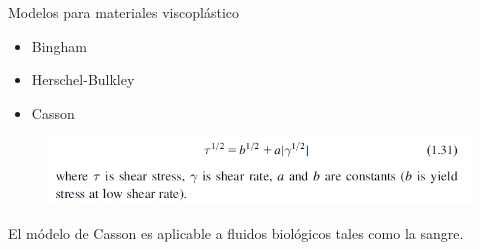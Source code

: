 \begin{frame}{Modelos para materiales viscoplástico}
\justifying
\begin{itemize}
\item Bingham
\item Herschel-Bulkley
\item Casson
\end{itemize}
\begin{figure}[H]
\centering
\includegraphics[scale=0.4]{Section_Files/S2-imagenes-Manuel/23.png}
\end{figure}
El módelo de Casson es aplicable a fluidos biológicos tales como la sangre.
\end{frame}